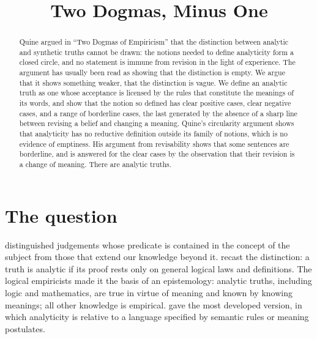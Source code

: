 \documentclass{situationist-preprint}
\title{Two Dogmas, Minus One}
\begin{document}
\maketitle

\begin{abstract}
Quine argued in \enquote{Two Dogmas of Empiricism} that the distinction between analytic and synthetic truths cannot be drawn: the notions needed to define analyticity form a closed circle, and no statement is immune from revision in the light of experience. The argument has usually been read as showing that the distinction is empty. We argue that it shows something weaker, that the distinction is vague. We define an analytic truth as one whose acceptance is licensed by the rules that constitute the meanings of its words, and show that the notion so defined has clear positive cases, clear negative cases, and a range of borderline cases, the last generated by the absence of a sharp line between revising a belief and changing a meaning. Quine's circularity argument shows that analyticity has no reductive definition outside its family of notions, which is no evidence of emptiness. His argument from revisability shows that some sentences are borderline, and is answered for the clear cases by the observation that their revision is a change of meaning. There are analytic truths.
\end{abstract}

\section{The question}

\citet[A6--7/B10--11]{Kant1787} distinguished judgements whose predicate is contained in the concept of the subject from those that extend our knowledge beyond it. \citet[\S3]{Frege1884} recast the distinction: a truth is analytic if its proof rests only on general logical laws and definitions. The logical empiricists made it the basis of an epistemology: analytic truths, including logic and mathematics, are true in virtue of meaning and known by knowing meanings; all other knowledge is empirical. \citet{Carnap1947,Carnap1952} gave the most developed version, in which analyticity is relative to a language specified by semantic rules or meaning postulates.
\end{document}

